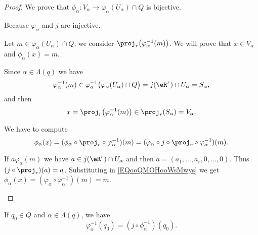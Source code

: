 \begin{proof}
	We prove that \(\phi_{\alpha} \colon V_{\alpha}\to \varphi_{\alpha}(U_{\alpha})\cap Q  \) is bijective.
	\begin{subproof}
		\spitem[Injective]
		Because \( \varphi_{\alpha}\) and \( j\) are injective.

		\spitem[Surjective]
		Let \( m\in \varphi_{\alpha}(U_{\alpha})\cap Q\); we consider \( \proj_r\big( \varphi_{\alpha}^{-1}(m) \big)\). We will prove that \( x\in V_{\alpha}\) and \( \phi_{\alpha}(x)=m\).
		\begin{subproof}
			\spitem[\( x\in V_{\alpha}\)]
			Since \( \alpha\in \Lambda(q)\) we have
			\begin{equation}
				\varphi_{\alpha}^{-1}(m)\in\varphi_{\alpha}^{-1}\big( \varphi_{\alpha}(U_{\alpha})\cap Q \big)=j(\eR^r)\cap U_{\alpha}=S_{\alpha},
			\end{equation}
			and then
			\begin{equation}
				x=\proj_r\big( \varphi_{\alpha}^{-1}(m) \big)\in\proj_r(S_{\alpha})=V_{\alpha}.
			\end{equation}

			\spitem[\( \phi_{\alpha}(x)=m\)]
			We have to compute
			\begin{equation}	\label{EQooQMOHooWsMwys}
				\phi_{\alpha}(x)=(\phi_{\alpha}\circ\proj_r\circ\varphi_{\alpha}^{-1})(m)=(\varphi_{\alpha}\circ j\circ\proj_r\circ\varphi_{\alpha}^{-1})(m).
			\end{equation}
		\end{subproof}
		If \( a\varphi_{\alpha}(m)\) we have \( a\in j(\eR^r)\cap U_{\alpha}\) and then \( a=(a_1,\ldots,a_r,0,\ldots,0)\). Thus \( (j\circ\proj_r)(a)=a\). Substituting in \eqref{EQooQMOHooWsMwys} we get \( \phi_{\alpha}(x)=(\varphi_{\alpha}\circ\varphi_{\alpha}^{-1})(m)=m\).
	\end{subproof}
\end{proof}

\begin{lemma}	\label{LEMooKRKXooINCjyh}
	If \( q_0\in Q\) and \( \alpha\in \Lambda(q)\), we have
	\begin{equation}
		\varphi_{\alpha}^{-1}(q_0)=(j\circ\phi_{\alpha}^{-1})(q_0).
	\end{equation}
\end{lemma}

